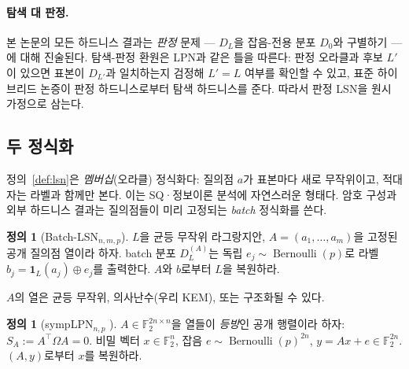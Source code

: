 \documentclass[11pt,a4paper]{article}
\theoremstyle{plain}
\theoremstyle{definition}
\newtheorem{definition}[theorem]{정의}
\newcommand{\F}{\mathbb{F}}
\begin{document}
\paragraph{탐색 대 판정.} 본 논문의 모든 하드니스 결과는 \emph{판정} 문제 --- $D_L$을 잡음-전용 분포 $D_0$와 구별하기 --- 에 대해 진술된다. 탐색-판정 환원은 LPN과 같은 틀을 따른다: 판정 오라클과 후보 $L'$이 있으면 표본이 $D_{L'}$과 일치하는지 검정해 $L'=L$ 여부를 확인할 수 있고, 표준 하이브리드 논증이 판정 하드니스로부터 탐색 하드니스를 준다. 따라서 판정 LSN을 원시 가정으로 삼는다.

\subsection{두 정식화}
\label{subsec:two-forms}

정의~\ref{def:lsn}은 \emph{멤버십}(오라클) 정식화다: 질의점 $a$가 표본마다 새로 무작위이고, 적대자는 라벨과 함께만 본다. 이는 SQ·정보이론 분석에 자연스러운 형태다. 암호 구성과 외부 하드니스 결과는 질의점들이 미리 고정되는 \emph{batch} 정식화를 쓴다.

\begin{definition}[Batch-LSN$_{n,m,p}$]
$L$을 균등 무작위 라그랑지안, $A = (a_1,\dots,a_m)$을 고정된 공개 질의점 열이라 하자. batch 분포 $D_L^{(A)}$는 독립 $e_j \sim \operatorname{Bernoulli}(p)$로 라벨 $b_j = \mathbf{1}_L(a_j) \oplus e_j$를 출력한다. $A$와 $b$로부터 $L$을 복원하라.
\end{definition}

$A$의 열은 균등 무작위, 의사난수(우리 KEM), 또는 구조화될 수 있다.

\begin{definition}[sympLPN$_{n,p}$ \cite{KLP+25,LPQR26}]
$A \in \F_2^{2n\times n}$을 열들이 \emph{등방}인 공개 행렬이라 하자: $S_A := A^{\!\top}\Omega A = 0$. 비밀 벡터 $x \in \F_2^n$, 잡음 $e \sim \operatorname{Bernoulli}(p)^{2n}$, $y = Ax + e \in \F_2^{2n}$. $(A,y)$로부터 $x$를 복원하라.
\end{definition}
\end{document}
